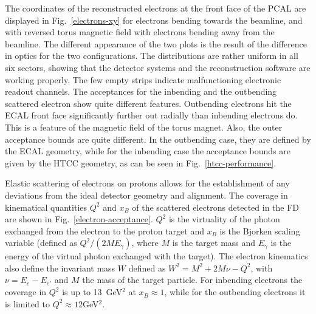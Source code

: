 \documentclass[final,3p,twocolumn]{elsarticle}
\begin{document}
The coordinates of the reconstructed electrons at the front face of the PCAL are displayed in
Fig.~\ref{electrons-xy} for electrons bending towards the beamline, and with
reversed torus magnetic field with electrons bending away from the beamline. The different appearance of the two
plots is the result of the difference in optics for the two configurations. The distributions are rather uniform in all
six sectors, showing that the detector systems and the reconstruction software are working properly. The few
empty strips indicate malfunctioning electronic readout channels. The acceptances for the inbending and the
outbending scattered electron show quite different features. Outbending electrons hit the ECAL front face
significantly further out radially than inbending electrons do. This is a feature of the magnetic field of the torus
magnet.  Also, the outer acceptance bounds are quite different. In the outbending case, they are defined by the
ECAL geometry, while for the inbending case the acceptance bounds are given by the HTCC geometry, as can be
seen in Fig.~\ref{htcc-performance}.      

Elastic scattering  of electrons on protons allows for the establishment of any deviations from the ideal detector
geometry and alignment. The coverage in kinematical quantities $Q^2$ and $x_B$ of the scattered electrons
detected in the FD are shown in Fig.~\ref{electron-acceptance}. $Q^2$ is the virtuality of the photon exchanged
from the electron to the proton target and $x_B$ is the Bjorken scaling variable (defined as $Q^2/(2 M E_\gamma)$,
where $M$ is the target mass and $E_\gamma$ is the energy of the virtual photon exchanged with the target). 
The electron kinematics also define the invariant mass $W$ defined as $W^2 = M^2 + 2M\nu - Q^2$, with
$\nu = E_e - E_{e'}$ and $M$ the mass of the target particle. 
For
inbending electrons the coverage in $Q^2$ is up to 13~GeV$^2$ at $x_B \approx 1$, while for the outbending
electrons it is limited to  $Q^2 \approx 12$GeV$^2$. 
\end{document}
